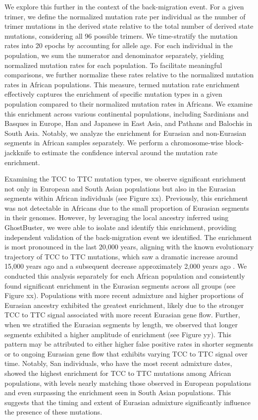 We explore this further in the context of the back-migration event. For a given trimer, we define the normalized mutation rate per individual as the number of trimer mutations in the derived state relative to the total number of derived state mutations, considering all 96 possible trimers. We time-stratify the mutation rates into 20 epochs by accounting for allele age. For each individual in the population, we sum the numerator and denominator separately, yielding normalized mutation rates for each population. To facilitate meaningful comparisons, we further normalize these rates relative to the normalized mutation rates in African populations. This measure, termed mutation rate enrichment effectively captures the enrichment of specific mutation types in a given population compared to their normalized mutation rates in Africans. We examine this enrichment across various continental populations, including Sardinians and Basques in Europe, Han and Japanese in East Asia, and Pathans and Balochis in South Asia. Notably, we analyze the enrichment for Eurasian and non-Eurasian segments in African samples separately. We perform a chromosome-wise block-jackknife to estimate the confidence interval around the mutation rate enrichment. 

Examining the TCC to TTC mutation types, we observe significant enrichment not only in European and South Asian populations but also in the Eurasian segments within African individuals (see Figure xx). Previously, this enrichment was not detectable in Africans due to the small proportion of Eurasian segments in their genomes. However, by leveraging the local ancestry inferred using GhostBuster, we were able to isolate and identify this enrichment, providing independent validation of the back-migration event we identified. The enrichment is most pronounced in the last 20,000 years, aligning with the known evolutionary trajectory of TCC to TTC mutations, which saw a dramatic increase around 15,000 years ago and a subsequent decrease approximately 2,000 years ago \cite{harris2017rapid}. We conducted this analysis separately for each African population and consistently found significant enrichment in the Eurasian segments across all groups (see Figure xx). Populations with more recent admixture and higher proportions of Eurasian ancestry exhibited the greatest enrichment, likely due to the stronger TCC to TTC signal associated with more recent Eurasian gene flow. Further, when we stratified the Eurasian segments by length, we observed that longer segments exhibited a higher amplitude of enrichment (see Figure yy). This pattern may be attributed to either higher false positive rates in shorter segments or to ongoing Eurasian gene flow that exhibits varying TCC to TTC signal over time. Notably, San individuals, who have the most recent admixture dates, showed the highest enrichment for TCC to TTC mutations among African populations, with levels nearly matching those observed in European populations and even surpassing the enrichment seen in South Asian populations. This suggests that the timing and extent of Eurasian admixture significantly influence the presence of these mutations.

